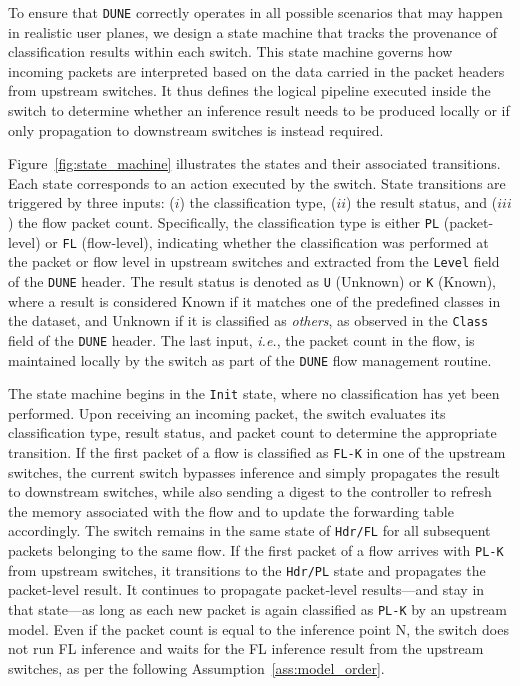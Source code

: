 \documentclass[journal]{IEEEtran}
\theoremstyle{plain} %
\newcommand{\ie}{\textit{i.e.},\xspace}
\newcommand{\mf}[1]{\textcolor{teal}{[Marco: #1]}}
\newcommand{\name}{\texttt{\fontsize{9}{11}\selectfont DUNE}\xspace}
\begin{document}
To ensure that \name correctly operates in all possible scenarios that may happen in realistic user planes, we design a state machine that tracks the provenance of classification results within each switch. This state machine governs how incoming packets are interpreted based on the data carried in the packet headers from upstream switches. It thus defines the logical pipeline executed inside the switch to determine whether an inference result needs to be produced locally or if only propagation to downstream switches is instead required.

Figure~\ref{fig:state_machine} illustrates the states and their associated transitions.
Each state corresponds to an action executed by the switch. State transitions are triggered by three inputs: ($i$) the classification type, ($ii$) the result status, and ($iii$) the flow packet count.
Specifically, the classification type is either \texttt{PL} (packet-level) or \texttt{FL} (flow-level), indicating whether the classification was performed at the packet or flow level in upstream switches and extracted from the \texttt{Level} field of the \name header. The result status is denoted as \texttt{U} (Unknown) or \texttt{K} (Known), where a result is considered Known if it matches one of the predefined classes in the dataset, and Unknown if it is classified as \textit{others}, as observed in the \texttt{Class} field of the \name header. The last input, \ie the packet count in the flow, is maintained locally by the switch as part of the \name flow management routine.

The state machine begins in the \texttt{Init} state, where no classification has yet been performed. Upon receiving an incoming packet, the switch evaluates its classification type, result status, and packet count to determine the appropriate transition. 
If the first packet of a flow is classified as \texttt{FL-K} in one of the upstream switches, the current switch bypasses inference and simply propagates the result to downstream switches, while also sending a digest to the controller to refresh the memory associated with the flow and to update the forwarding table accordingly. The switch remains in the same state of \texttt{Hdr/FL} for all subsequent packets belonging to the same flow.
If the first packet of a flow arrives with \texttt{PL-K} from upstream switches, it transitions to the \texttt{Hdr/PL} state and propagates the packet-level result. It continues to propagate packet‑level results—and stay in that state—as long as each new packet is again classified as \texttt{PL-K} by an upstream model. Even if the packet count is equal to the inference point N, the switch does not run FL inference and waits for the FL inference result from the upstream switches, as per the following Assumption~\ref{ass:model_order}.
\end{document}
